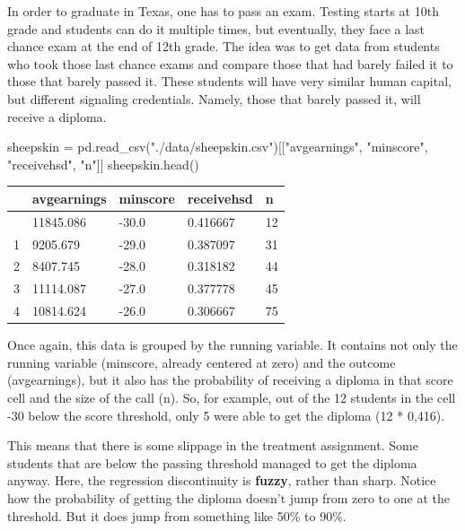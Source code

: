 \documentclass[
  letterpaper,
  DIV=11,
  numbers=noendperiod]{scrreprt}
\newenvironment{Shaded}{\begin{snugshade}}{\end{snugshade}}
\newcommand{\NormalTok}[1]{\textcolor[rgb]{0.00,0.23,0.31}{#1}}
\newcommand{\OperatorTok}[1]{\textcolor[rgb]{0.37,0.37,0.37}{#1}}
\newcommand{\StringTok}[1]{\textcolor[rgb]{0.13,0.47,0.30}{#1}}
\begin{document}
In order to graduate in Texas, one has to pass an exam. Testing starts
at 10th grade and students can do it multiple times, but eventually,
they face a last chance exam at the end of 12th grade. The idea was to
get data from students who took those last chance exams and compare
those that had barely failed it to those that barely passed it. These
students will have very similar human capital, but different signaling
credentials. Namely, those that barely passed it, will receive a
diploma.

\begin{Shaded}
\begin{Highlighting}[]
\NormalTok{sheepskin }\OperatorTok{=}\NormalTok{ pd.read\_csv(}\StringTok{"./data/sheepskin.csv"}\NormalTok{)[[}\StringTok{"avgearnings"}\NormalTok{, }\StringTok{"minscore"}\NormalTok{, }\StringTok{"receivehsd"}\NormalTok{, }\StringTok{"n"}\NormalTok{]]}
\NormalTok{sheepskin.head()}
\end{Highlighting}
\end{Shaded}

\begin{longtable}[]{@{}lllll@{}}
\toprule\noalign{}
& avgearnings & minscore & receivehsd & n \\
\midrule\noalign{}
\endhead
\bottomrule\noalign{}
\endlastfoot
0 & 11845.086 & -30.0 & 0.416667 & 12 \\
1 & 9205.679 & -29.0 & 0.387097 & 31 \\
2 & 8407.745 & -28.0 & 0.318182 & 44 \\
3 & 11114.087 & -27.0 & 0.377778 & 45 \\
4 & 10814.624 & -26.0 & 0.306667 & 75 \\
\end{longtable}

Once again, this data is grouped by the running variable. It contains
not only the running variable (minscore, already centered at zero) and
the outcome (avgearnings), but it also has the probability of receiving
a diploma in that score cell and the size of the call (n). So, for
example, out of the 12 students in the cell -30 below the score
threshold, only 5 were able to get the diploma (12 * 0,416).

This means that there is some slippage in the treatment assignment. Some
students that are below the passing threshold managed to get the diploma
anyway. Here, the regression discontinuity is \textbf{fuzzy}, rather
than sharp. Notice how the probability of getting the diploma doesn't
jump from zero to one at the threshold. But it does jump from something
like 50\% to 90\%.
\end{document}
